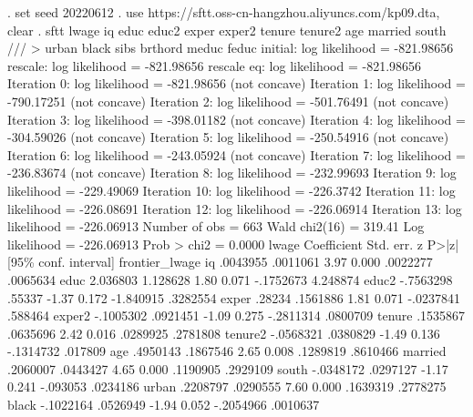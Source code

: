 . set seed 20220612
{\smallskip}
. use https://sftt.oss-cn-hangzhou.aliyuncs.com/kp09.dta, clear
{\smallskip}
. sftt lwage iq educ educ2 exper exper2 tenure tenure2 age married south ///
>          urban black sibs brthord meduc feduc
{\smallskip}
initial:       log likelihood = -821.98656
rescale:       log likelihood = -821.98656
rescale eq:    log likelihood = -821.98656
Iteration 0:   log likelihood = -821.98656  (not concave)
Iteration 1:   log likelihood = -790.17251  (not concave)
Iteration 2:   log likelihood = -501.76491  (not concave)
Iteration 3:   log likelihood = -398.01182  (not concave)
Iteration 4:   log likelihood = -304.59026  (not concave)
Iteration 5:   log likelihood = -250.54916  (not concave)
Iteration 6:   log likelihood = -243.05924  (not concave)
Iteration 7:   log likelihood = -236.83674  (not concave)
Iteration 8:   log likelihood = -232.99693  
Iteration 9:   log likelihood = -229.49069  
Iteration 10:  log likelihood =  -226.3742  
Iteration 11:  log likelihood = -226.08691  
Iteration 12:  log likelihood = -226.06914  
Iteration 13:  log likelihood = -226.06913  
{\smallskip}
{}
{\smallskip}
                                                        Number of obs =    663
                                                        Wald chi2(16) = 319.41
Log likelihood = -226.06913                             Prob > chi2   = 0.0000
{\smallskip}
         lwage {\VBAR} Coefficient  Std. err.      z    P>|z|     [95\% conf. interval]
frontier_lwage {\VBAR}
            iq {\VBAR}   .0043955   .0011061     3.97   0.000     .0022277    .0065634
          educ {\VBAR}   2.036803   1.128628     1.80   0.071    -.1752673    4.248874
         educ2 {\VBAR}  -.7563298     .55337    -1.37   0.172    -1.840915    .3282554
         exper {\VBAR}     .28234   .1561886     1.81   0.071    -.0237841     .588464
        exper2 {\VBAR}  -.1005302   .0921451    -1.09   0.275    -.2811314    .0800709
        tenure {\VBAR}   .1535867   .0635696     2.42   0.016     .0289925    .2781808
       tenure2 {\VBAR}  -.0568321   .0380829    -1.49   0.136    -.1314732     .017809
           age {\VBAR}   .4950143   .1867546     2.65   0.008     .1289819    .8610466
       married {\VBAR}   .2060007   .0443427     4.65   0.000     .1190905    .2929109
         south {\VBAR}  -.0348172   .0297127    -1.17   0.241     -.093053    .0234186
         urban {\VBAR}   .2208797   .0290555     7.60   0.000     .1639319    .2778275
         black {\VBAR}  -.1022164   .0526949    -1.94   0.052    -.2054966    .0010637
